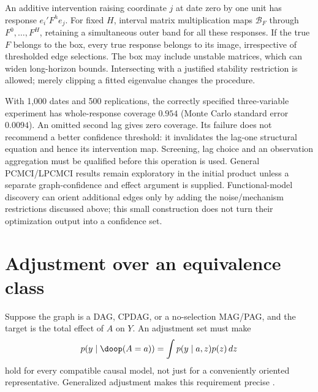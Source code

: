 An additive intervention raising coordinate $j$ at date zero by one unit
has response $e_i'F^he_j$. For fixed $H$, interval matrix multiplication
maps $\mathcal B_F$ through $F^0,\ldots,F^H$, retaining a simultaneous
outer band for all these responses. If the true $F$ belongs to the box,
every true response belongs to its image, irrespective of thresholded
edge selections. The box may include unstable matrices, which can widen
long-horizon bounds. Intersecting with a justified stability restriction
is allowed; merely clipping a fitted eigenvalue changes the procedure.

With 1,000 dates and 500 replications, the correctly specified three-variable
experiment has whole-response coverage $0.954$ (Monte Carlo standard
error $0.0094$). An omitted second lag gives zero coverage. Its failure
does not recommend a better confidence threshold: it invalidates the
lag-one structural equation and hence its intervention map. Screening,
lag choice and an observation aggregation must be qualified before this
operation is used. General PCMCI/LPCMCI results remain exploratory in the
initial product unless a separate graph-confidence and effect argument
is supplied. Functional-model discovery can orient additional edges only
by adding the noise/mechanism restrictions discussed above; this small
construction does not turn their optimization output into a confidence set.




\section{Adjustment over an equivalence class}
\label{r3:general-adjustment}
Suppose the graph is a DAG, CPDAG, or a no-selection MAG/PAG, and the
target is the total effect of $A$ on $Y$. An adjustment set must make
\[
 p(y\mid\doop(A=a))=\int p(y\mid a,z)p(z)\,dz
\]
hold for every compatible causal model, not just for a conveniently
oriented representative. Generalized adjustment makes this requirement
precise \citep[Definitions 1--4, Theorem 5]{perkovic2018}.

